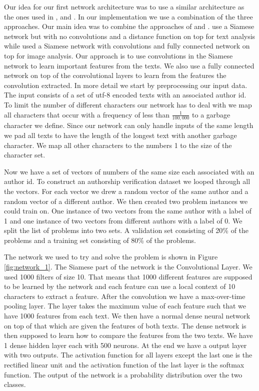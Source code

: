 Our idea for our first network architecture was to use a similar architecture
as the ones used in \cite{Koch2015SiameseNN}, \cite{NIPS1993_769} and
\cite{qian:2018}. In our implementation we use a combination of the three
approaches. Our main idea was to combine the approaches of \cite{qian:2018}
and \cite{Koch2015SiameseNN}. \cite{qian:2018} use a Siamese network but
with no convolutions and a distance function on top for text analysis while
\cite{Koch2015SiameseNN} used a Siamese network with convolutions and fully
connected network on top for image analysis. Our approach is to use convolutions
in the Siamese network to learn important features from the texts. We also use
a fully connected network on top of the convolutional layers to learn from the
features the convolution extracted. In more detail we start by preprocessing
our input data. The input consists of a set of utf-8 encoded texts with an
associated author id. To limit the number of different characters our network
has to deal with we map all characters that occur with a frequency of less than
$\frac{1}{100,000}$ to a garbage character we define. Since our network can only
handle inputs of the same length we pad all texts to have the length of the
longest text with another garbage character. We map all other characters to the
numbers 1 to the size of the character set.

Now we have a set of vectors of numbers of the same size each associated with
an author id. To construct an authorship verification dataset we looped through
all the vectors. For each vector we drew a random vector of the same author and
a random vector of a different author. We then created two problem instances we
could train on. One instance of two vectors from the same author with a label of
1 and one instance of two vectors from different authors with a label of 0. We
split the list of problems into two sets. A validation set consisting of 20\% of
the problems and a training set consisting of 80\% of the problems.

The network we used to try and solve the problem is shown in Figure
\ref{fig:network_1}. The Siamese part of the network is the Convolutional
Layer. We used 1000 filters of size 10. That means that 1000 different features
are supposed to be learned by the network and each feature can use a local
context of 10 characters to extract a feature. After the convolution we have a
max-over-time pooling layer. The layer takes the maximum value of each feature
such that we have 1000 features from each text. We then have a normal dense
neural network on top of that which are given the features of both texts. The
dense network is then supposed to learn how to compare the features from the two
texts. We have 1 dense hidden layer each with 500 neurons. At the end we have
a output layer with two outputs. The activation function for all layers except
the last one is the rectified linear unit and the activation function of the
last layer is the softmax function. The output of the network is a probability
distribution over the two classes.

